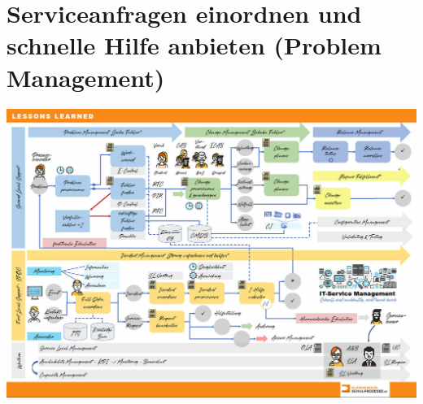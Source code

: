 \documentclass[a4paper, 12pt]{report}
\begin{document}
\section{Serviceanfragen einordnen und schnelle Hilfe anbieten (Problem 
Management)}

\begin{center}
	\includegraphics[width=16cm]{serviceanfragen_bearbeiten.jpg}
\end{center}

\end{document}
